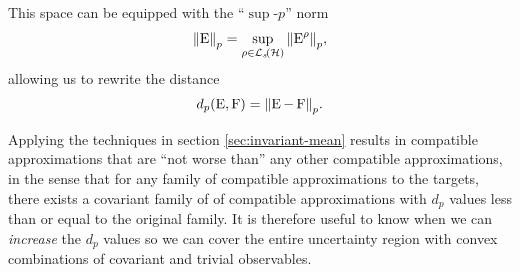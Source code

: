 This space can be equipped with the ``$\sup$-$p$'' norm
\begin{equation}
  \pnorm{\ope} =  \sup_{\rho\in\saops[\hcal]} \pnorm{\ope^\rho},
\end{equation}
allowing us to rewrite the distance
\begin{align}
  d_p(\ope, \opf) = \pnorm{\ope - \opf}.
\end{align}

Applying the techniques in section \ref{sec:invariant-mean} results in compatible approximations that are ``not worse than'' any other compatible approximations, in the sense that for any family of compatible approximations to the targets, there exists a covariant family of of compatible approximations with $d_p$ values less than or equal to the original family. It is therefore useful to know when we can \emph{increase} the $d_p$ values so we can cover the entire uncertainty region with convex combinations of covariant and trivial observables.

